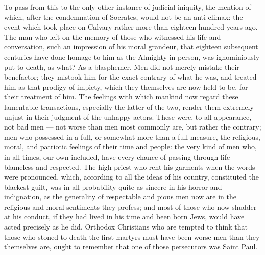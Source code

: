 \documentclass[12pt]{report}
\begin{document}
To pass from this to the only other instance of judicial iniquity, the mention of which, after the condemnation of Socrates, would not be an anti-climax: the event which took place on Calvary rather more than eighteen hundred years ago. The man who left on the memory of those who witnessed his life and conversation, such an impression of his moral grandeur, that eighteen subsequent centuries have done homage to him as the Almighty in person, was ignominiously put to death, as what? As a blasphemer. Men did not merely mistake their benefactor; they mistook him for the exact contrary of what he was, and treated him as that prodigy of impiety, which they themselves are now held to be, for their treatment of him. The feelings with which mankind now regard these lamentable transactions, especially the latter of the two, render them extremely unjust in their judgment of the unhappy actors. These were, to all appearance, not bad men — not worse than men most commonly are, but rather the contrary; men who possessed in a full, or somewhat more than a full measure, the religious, moral, and patriotic feelings of their time and people: the very kind of men who, in all times, our own included, have every chance of passing through life blameless and respected. The high-priest who rent his garments when the words were pronounced, which, according to all the ideas of his country, constituted the blackest guilt, was in all probability quite as sincere in his horror and indignation, as the generality of respectable and pious men now are in the religious and moral sentiments they profess; and most of those who now shudder at his conduct, if they had lived in his time and been born Jews, would have acted precisely as he did. Orthodox Christians who are tempted to think that those who stoned to death the first martyrs must have been worse men than they themselves are, ought to remember that one of those persecutors was Saint Paul.
\end{document}
